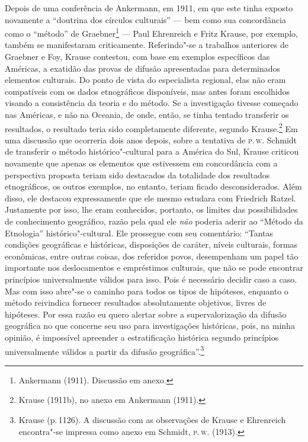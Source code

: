 Depois de uma conferência de Ankermann, em 1911, em que este tinha
exposto novamente a ``doutrina dos círculos culturais'' --- bem como sua
concordância como o ``método'' de Graebner\footnote{Ankermann (1911).
  Discussão em anexo.} --- Paul Ehrenreich e Fritz Krause, por exemplo,
também se manifestaram criticamente. Referindo"-se a trabalhos
anteriores de Graebner e Foy, Krause contestou, com base em exemplos
específicos das Américas, a exatidão das provas de difusão apresentadas
para determinados elementos culturais. Do ponto de vista do especialista
regional, elas não eram compatíveis com os dados etnográficos
disponíveis, mas antes foram escolhidos visando a consistência da teoria
e do método. Se a investigação tivesse começado nas Américas, e não na
Oceania, de onde, então, se tinha tentado transferir os resultados, o
resultado teria sido completamente diferente, segundo Krause.\footnote{Krause
  (1911b), no anexo em Ankermann (1911).} Em uma discussão que ocorreria
dois anos depois, sobre a tentativa de \textsc{p}.\,\textsc{w}. Schmidt de transferir o
método histórico"-cultural para a América do Sul, Krause criticou
novamente que apenas os elementos que estivessem em concordância com a
perspectiva proposta teriam sido destacados da totalidade dos resultados
etnográficos, os outros exemplos, no entanto, teriam ficado
desconsiderados. Além disso, ele destacou expressamente que ele mesmo
estudara com Friedrich Ratzel. Justamente por isso, lhe eram
conhecidos, portanto, os limites das possibilidades de conhecimento
geográfico, razão pela qual ele \textit{não} poderia aderir ao ``Método da
Etnologia'' histórico"-cultural. Ele prossegue com seu comentário:
``Tantas condições geográficas e históricas, disposições de caráter,
níveis culturais, formas econômicas, entre outras coisas, dos referidos
povos, desempenham um papel tão importante nos deslocamentos e
empréstimos culturais, que não se pode encontrar princípios
universalmente válidos para isso. Pois é necessário decidir caso a
caso. Mas com isso abre"-se o caminho para todos os tipos de hipóteses,
enquanto o método reivindica fornecer resultados absolutamente
objetivos, livres de hipóteses. Por essa razão eu quero alertar sobre a
supervalorização da difusão geográfica no que concerne seu uso para
investigações históricas, pois, na minha opinião, é impossível apreender
a estratificação histórica segundo princípios universalmente válidos a
partir da difusão geográfica''.\footnote{Krause (p.\,1126). A discussão
  com as observações de Krause e Ehrenreich encontra"-se impressa como
  anexo em Schmidt, \textsc{p}.\,\textsc{w}. (1913).}

